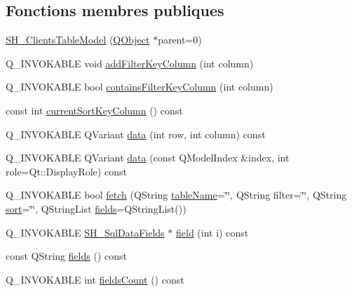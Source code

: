\subsection*{Fonctions membres publiques}
\begin{DoxyCompactItemize}
\item 
\hyperlink{classSH__ClientsTableModel_ac0fce2c2880ff26de22fce2abb6432a3}{S\-H\-\_\-\-Clients\-Table\-Model} (\hyperlink{classQObject}{Q\-Object} $\ast$parent=0)
\item 
Q\-\_\-\-I\-N\-V\-O\-K\-A\-B\-L\-E void \hyperlink{classSH__ExtendedProxyModel_a4e98e24b6b94adf31a2c5e935a48f831}{add\-Filter\-Key\-Column} (int column)
\item 
Q\-\_\-\-I\-N\-V\-O\-K\-A\-B\-L\-E bool \hyperlink{classSH__ExtendedProxyModel_a865da9bd795526dc63b8c6447d59cfc0}{contains\-Filter\-Key\-Column} (int column)
\item 
const int \hyperlink{classSH__ExtendedProxyModel_a76786ad4b81dbd521a610c2f6f973a96}{current\-Sort\-Key\-Column} () const 
\item 
Q\-\_\-\-I\-N\-V\-O\-K\-A\-B\-L\-E Q\-Variant \hyperlink{classSH__ExtendedProxyModel_aca6cc510f740e847e0cfc06e0adb5771}{data} (int row, int column) const 
\item 
Q\-\_\-\-I\-N\-V\-O\-K\-A\-B\-L\-E Q\-Variant \hyperlink{classSH__ExtendedProxyModel_afbc947efbe1107fc5bf8926c52902a1c}{data} (const Q\-Model\-Index \&index, int role=Qt\-::\-Display\-Role) const 
\item 
Q\-\_\-\-I\-N\-V\-O\-K\-A\-B\-L\-E bool \hyperlink{classSH__ExtendedProxyModel_a64f684a4a7d35925ff4f4b81984da60e}{fetch} (Q\-String \hyperlink{classSH__ExtendedProxyModel_aba6e6f8bbde17ea533de3e9a127c804a}{table\-Name}=\char`\"{}\char`\"{}, Q\-String filter=\char`\"{}\char`\"{}, Q\-String \hyperlink{classSH__ExtendedProxyModel_a5ed9b14df78667efe8b22d19617d6c4b}{sort}=\char`\"{}\char`\"{}, Q\-String\-List \hyperlink{classSH__ExtendedProxyModel_addbd48beef730fe7adfaffcaca8b256a}{fields}=Q\-String\-List())
\item 
Q\-\_\-\-I\-N\-V\-O\-K\-A\-B\-L\-E \hyperlink{classSH__SqlDataFields}{S\-H\-\_\-\-Sql\-Data\-Fields} $\ast$ \hyperlink{classSH__ExtendedProxyModel_ac73fae31c6ad69663b4df97f65ec945f}{field} (int i) const 
\item 
const Q\-String \hyperlink{classSH__ExtendedProxyModel_addbd48beef730fe7adfaffcaca8b256a}{fields} () const 
\item 
Q\-\_\-\-I\-N\-V\-O\-K\-A\-B\-L\-E int \hyperlink{classSH__ExtendedProxyModel_a5a5e6b84a9a397e096f4404cec5e9e0c}{fields\-Count} () const 

\end{DoxyCompactItemize}
